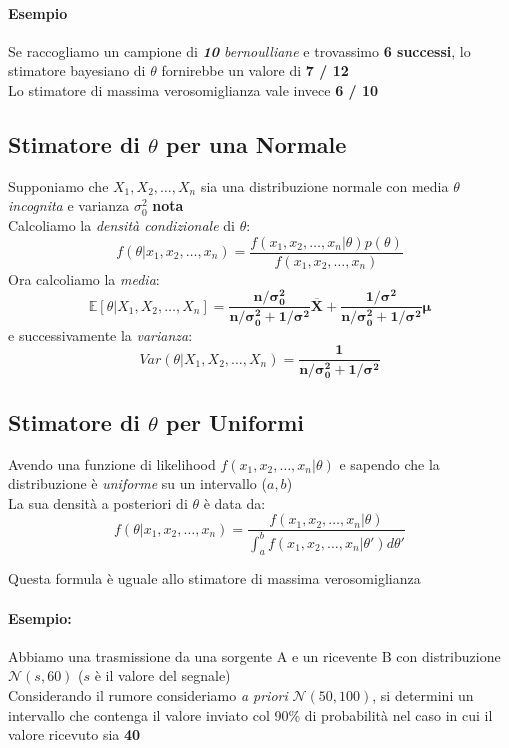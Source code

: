 \documentclass[]{article}
\newcommand{\ev}{\mathbb{E}[X]}
\renewcommand{\ev}[1]{\mathbb{E}\left[#1\right]}
\begin{document}
    \paragraph{Esempio} Se raccogliamo un campione di \textit{\textbf{10} bernoulliane} e trovassimo \textbf{6 successi}, lo stimatore bayesiano di $\theta$ fornirebbe un valore di \textbf{7 / 12} \\
    Lo stimatore di massima verosomiglianza vale invece \textbf{6 / 10}
    \subsection{Stimatore di $\theta$ per una Normale}
    Supponiamo che $X_1, X_2, \ldots, X_n$ sia una distribuzione normale con media $\theta$ \textit{incognita} e varianza $\sigma^2_0$ \textbf{nota} \\[2ex]
    Calcoliamo la \textit{densità condizionale} di $\theta$:
    \[ f(\theta \rvert x_1, x_2, \ldots, x_n) = \frac{f(x_1, x_2, \ldots, x_n \rvert \theta) p(\theta)}{f(x_1, x_2, \ldots, x_n)} \]
    Ora calcoliamo la \textit{media}:
    \[ \ev{\theta \rvert X_1, X_2, \ldots, X_n } = \boldsymbol{\frac{n / \sigma^2_0}{n / \sigma^2_0 + 1 / \sigma^2} \overline{X} + \frac{1 / \sigma^2}{n / \sigma^2_0 + 1 / \sigma^2} \mu} \]
    e successivamente la \textit{varianza}:
    \[ Var(\theta \rvert X_1, X_2, \ldots, X_n) = \boldsymbol{\frac{1}{n / \sigma^2_0 + 1 / \sigma^2}} \]
    \subsection{Stimatore di $\theta$ per Uniformi}
    Avendo una funzione di likelihood $f(x_1, x_2, \ldots, x_n \rvert \theta)$ e sapendo che la distribuzione è \textit{uniforme} su un intervallo ($a,b$) \\ 
    La sua densità a posteriori di $\theta$ è data da:
    \[ f(\theta \rvert x_1, x_2, \ldots, x_n) = \frac{f(x_1,x_2, \ldots, x_n \rvert \theta)}{\int_{a}^{b} f(x_1, x_2, \ldots, x_n \rvert \theta') d \theta'} \]
    \centerline{Questa formula è uguale allo stimatore di massima verosomiglianza}
    \paragraph{Esempio:} Abbiamo una trasmissione da una sorgente A e un ricevente B con distribuzione $\mathcal{N}(s, 60)$ ($s$ è il valore del segnale) \\
    Considerando il rumore consideriamo \textit{a priori} $\mathcal{N}(50, 100)$, si determini un intervallo che contenga il valore inviato col 90\% di probabilità nel caso in cui il valore ricevuto sia \textbf{40}
\end{document}
